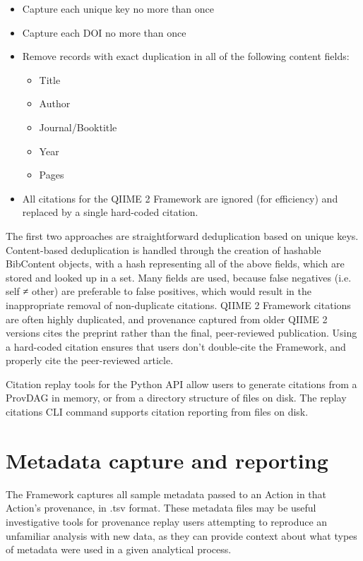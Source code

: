 \begin{itemize}
\item Capture each unique key no more than once
\item Capture each DOI no more than once
\item Remove records with exact duplication in all of the following content fields:
    \begin{itemize}
    \item Title
    \item Author
    \item Journal/Booktitle
    \item Year
    \item Pages
    \end{itemize}
\item All citations for the QIIME 2 Framework are ignored (for efficiency) and replaced by a single hard-coded citation.
\end{itemize}

The first two approaches are straightforward deduplication based on unique keys.
Content-based deduplication is handled through the creation of hashable
BibContent objects, with a hash representing all of the above fields, which are
stored and looked up in a set. Many fields are used, because false negatives
(i.e. self ≠ other) are preferable to false positives, which would result in
the inappropriate removal of non-duplicate citations.  QIIME 2 Framework
citations are often highly duplicated, and provenance captured from older
QIIME 2 versions cites the preprint rather than the final, peer-reviewed
publication. Using a hard-coded citation ensures that users don’t double-cite
the Framework, and properly cite the peer-reviewed article.

Citation replay tools for the Python API allow users to generate citations from
a ProvDAG in memory, or from a directory structure of files on disk. The replay
citations CLI command supports citation reporting from files on disk.


\section{Metadata capture and reporting}

The Framework captures all sample metadata passed to an Action in that Action’s
provenance, in .tsv format. These metadata files may be useful investigative
tools for provenance replay users attempting to reproduce an unfamiliar analysis
with new data, as they can provide context about what types of metadata were
used in a given analytical process.

